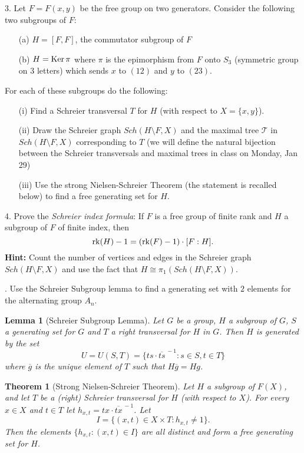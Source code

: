 \documentclass[12pt]{amsart}
\newtheorem* {Theorem}    {Theorem}
\newtheorem* {Lemma}    {Lemma}
\begin{document}
3. Let $F=F(x,y)$ be the free group on two generators. Consider the following two subgroups of $F$:
\begin{itemize}
\item[(a)] $H=[F,F]$, the commutator subgroup of $F$
\item[(b)] $H={\rm Ker}\,\pi$ where $\pi$ is the epimorphism from $F$ onto $S_3$ (symmetric group on $3$ letters)
which sends $x$ to $(12)$ and $y$ to $(23)$.
\end{itemize}
For each of these subgroups do the following:
\begin{itemize}
\item[(i)] Find a Schreier transversal $T$ for $H$ (with respect to $X=\{x,y\}$).
\item[(ii)] Draw the Schreier graph $Sch(H\setminus F,X)$ and the maximal tree $\mathcal T$ in $Sch(H\setminus F,X)$ corresponding to $T$
(we will define the natural bijection between the Schreier transversals and maximal trees in class on Monday, Jan 29)
\item[(iii)] Use the strong Nielsen-Schreier Theorem (the statement is recalled below) to find a free generating set for $H$.
\end{itemize}
\skv

4. Prove the {\it Schreier index formula}: If $F$ is a free group of finite rank and $H$ a subgroup of $F$ of finite index,
then $${\rm rk}(H)-1=({\rm rk}(F)-1)\cdot [F:H].$$ 
{\bf Hint:} Count the number of vertices and edges in the Schreier graph $Sch(H\setminus F,X)$
and use the fact that $H\cong \pi_1(Sch(H\setminus F,X))$. 
 
. Use the Schreier Subgroup lemma to find a generating set with $2$ elements for the alternating group $A_n$.
\skv
\begin{Lemma}[Schreier Subgroup Lemma] Let $G$ be a group, $H$ a subgroup of $G$, $S$ a generating set for $G$ and $T$ a right transversal for $H$ in $G$.
Then $H$ is generated by the set
$$U=U(S,T)=\{ts\cdot{\overline{ts}}^{\,-1}: s\in S, t\in T\}$$
where $\overline g$ is the unique element of $T$ such that $H\overline g=Hg$.
\end{Lemma}

\begin{Theorem}[Strong Nielsen-Schreier Theorem] Let $H$ a subgroup of $F(X)$, and let $T$ be a (right) Schreier transversal for $H$ (with respect to $X$). For every $x\in X$ and $t\in T$ let $h_{x,t}=tx\cdot {\overline{tx}}^{\,-1}$.
Let $$I=\{(x,t)\in X\times T: h_{x,t}\neq 1\}.$$ Then the elements $\{h_{x,t}: (x,t)\in I\}$ are all distinct and form a free 
generating set for $H$.
\end{Theorem}
\end{document}
